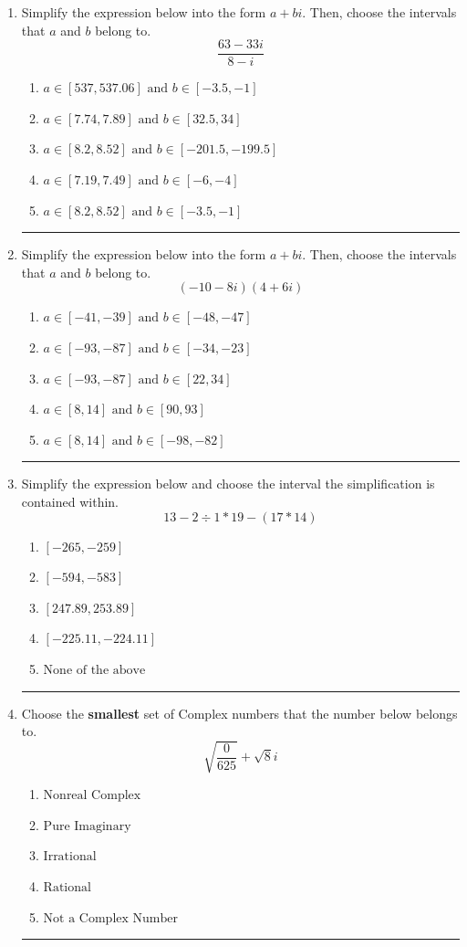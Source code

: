 \documentclass[14pt]{extbook}
\newcommand{\litem}[1]{\item#1\hspace*{-1cm}\rule{\textwidth}{0.4pt}}
\begin{document}
\begin{enumerate}
\litem{
Simplify the expression below into the form $a+bi$. Then, choose the intervals that $a$ and $b$ belong to.\[ \frac{63 - 33 i}{8 - i} \]\begin{enumerate}[label=\Alph*.]
\item \( a \in [537, 537.06] \text{ and } b \in [-3.5, -1] \)
\item \( a \in [7.74, 7.89] \text{ and } b \in [32.5, 34] \)
\item \( a \in [8.2, 8.52] \text{ and } b \in [-201.5, -199.5] \)
\item \( a \in [7.19, 7.49] \text{ and } b \in [-6, -4] \)
\item \( a \in [8.2, 8.52] \text{ and } b \in [-3.5, -1] \)

\end{enumerate} }
\litem{
Simplify the expression below into the form $a+bi$. Then, choose the intervals that $a$ and $b$ belong to.\[ (-10 - 8 i)(4 + 6 i) \]\begin{enumerate}[label=\Alph*.]
\item \( a \in [-41, -39] \text{ and } b \in [-48, -47] \)
\item \( a \in [-93, -87] \text{ and } b \in [-34, -23] \)
\item \( a \in [-93, -87] \text{ and } b \in [22, 34] \)
\item \( a \in [8, 14] \text{ and } b \in [90, 93] \)
\item \( a \in [8, 14] \text{ and } b \in [-98, -82] \)

\end{enumerate} }
\litem{
Simplify the expression below and choose the interval the simplification is contained within.\[ 13 - 2 \div 1 * 19 - (17 * 14) \]\begin{enumerate}[label=\Alph*.]
\item \( [-265, -259] \)
\item \( [-594, -583] \)
\item \( [247.89, 253.89] \)
\item \( [-225.11, -224.11] \)
\item \( \text{None of the above} \)

\end{enumerate} }
\litem{
Choose the \textbf{smallest} set of Complex numbers that the number below belongs to.\[ \sqrt{\frac{0}{625}}+\sqrt{8}i \]\begin{enumerate}[label=\Alph*.]
\item \( \text{Nonreal Complex} \)
\item \( \text{Pure Imaginary} \)
\item \( \text{Irrational} \)
\item \( \text{Rational} \)
\item \( \text{Not a Complex Number} \)


\end{enumerate}}
\end{enumerate}
\end{document}
